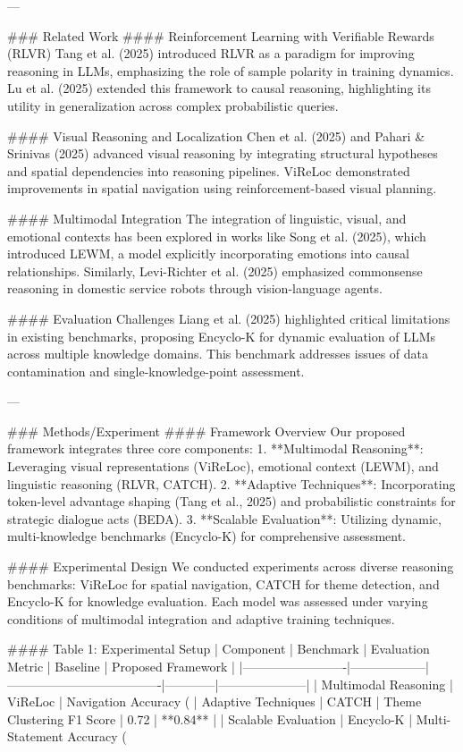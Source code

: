 ---

### Related Work
#### Reinforcement Learning with Verifiable Rewards (RLVR)
Tang et al. (2025) introduced RLVR as a paradigm for improving reasoning in LLMs, emphasizing the role of sample polarity in training dynamics. Lu et al. (2025) extended this framework to causal reasoning, highlighting its utility in generalization across complex probabilistic queries.

#### Visual Reasoning and Localization
Chen et al. (2025) and Pahari & Srinivas (2025) advanced visual reasoning by integrating structural hypotheses and spatial dependencies into reasoning pipelines. ViReLoc demonstrated improvements in spatial navigation using reinforcement-based visual planning.

#### Multimodal Integration
The integration of linguistic, visual, and emotional contexts has been explored in works like Song et al. (2025), which introduced LEWM, a model explicitly incorporating emotions into causal relationships. Similarly, Levi-Richter et al. (2025) emphasized commonsense reasoning in domestic service robots through vision-language agents.

#### Evaluation Challenges
Liang et al. (2025) highlighted critical limitations in existing benchmarks, proposing Encyclo-K for dynamic evaluation of LLMs across multiple knowledge domains. This benchmark addresses issues of data contamination and single-knowledge-point assessment.

---

### Methods/Experiment
#### Framework Overview
Our proposed framework integrates three core components:
1. **Multimodal Reasoning**: Leveraging visual representations (ViReLoc), emotional context (LEWM), and linguistic reasoning (RLVR, CATCH).
2. **Adaptive Techniques**: Incorporating token-level advantage shaping (Tang et al., 2025) and probabilistic constraints for strategic dialogue acts (BEDA).
3. **Scalable Evaluation**: Utilizing dynamic, multi-knowledge benchmarks (Encyclo-K) for comprehensive assessment.

#### Experimental Design
We conducted experiments across diverse reasoning benchmarks: ViReLoc for spatial navigation, CATCH for theme detection, and Encyclo-K for knowledge evaluation. Each model was assessed under varying conditions of multimodal integration and adaptive training techniques.

#### Table 1: Experimental Setup
| Component               | Benchmark        | Evaluation Metric                   | Baseline   | Proposed Framework |
|-------------------------|------------------|-------------------------------------|------------|---------------------|
| Multimodal Reasoning    | ViReLoc          | Navigation Accuracy (%
| Adaptive Techniques     | CATCH            | Theme Clustering F1 Score           | 0.72       | **0.84**           |
| Scalable Evaluation     | Encyclo-K        | Multi-Statement Accuracy (%

